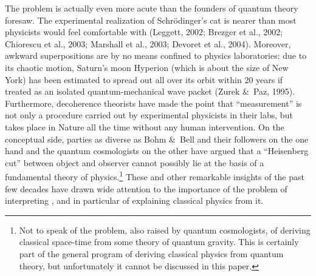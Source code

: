 \documentclass[12pt,titlepage]{article}
\begin{document}
The problem is actually even more acute than the founders of quantum theory foresaw. 
The experimental realization of  Schr\"{o}dinger's cat  is nearer than most physicists would feel comfortable with (Leggett, 2002;  Brezger et al., 2002; Chiorescu et al., 2003; 
Marshall et al., 2003;  Devoret et al., 2004). 
Moreover, awkward superpositions are by no means confined to physics 
 laboratories:  due to its chaotic motion, Saturn's moon Hyperion (which is about the size of New York) has been estimated to spread out all over its orbit within  20 years if treated as an isolated  quantum-mechanical wave packet (Zurek \&\ Paz, 1995). Furthermore, decoherence theorists have made the point  that ``measurement'' is not only a procedure carried out by experimental physicists in their labs, but takes place in Nature all the time without any human intervention. On the conceptual side, parties as diverse as  Bohm \&\ Bell and their followers on the one hand  and the quantum cosmologists on the other have argued
that a ``Heisenberg cut'' between object and observer cannot possibly lie at the basis of
a fundamental theory of physics.\footnote{Not to speak of the problem, also raised
by quantum cosmologists, of deriving classical space-time from some theory of quantum gravity. This is certainly part of the general program of deriving classical physics from quantum theory, but unfortunately it cannot be discussed in this paper. }
  These and other remarkable  insights of the past few decades have drawn wide attention to the importance of the problem of interpreting \qm, and in particular of explaining classical physics from it. 
\end{document}
